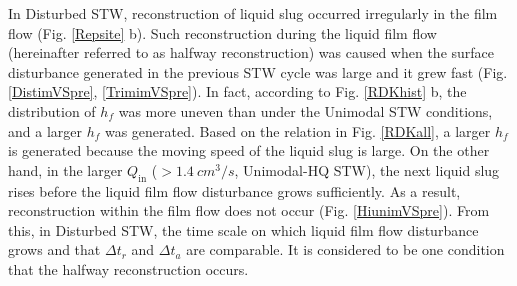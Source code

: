 \documentclass[aps,pre,preprint,groupedaddress,showkeys]{revtex4-2}
\begin{document}
In Disturbed STW, reconstruction of liquid slug occurred irregularly in the film flow (Fig. \ref{Repsite} b).
Such reconstruction during the liquid film flow (hereinafter referred to as halfway reconstruction) was caused when the surface disturbance generated in the previous STW cycle was large and it grew fast (Fig. \ref{DistimVSpre}, \ref{TrimimVSpre}).
In fact, according to Fig. \ref{RDKhist} b, the distribution of $ h_f $ was more uneven than under the Unimodal STW conditions, and a larger $ h_f $ was generated.
Based on the relation in Fig. \ref{RDKall}, a larger $ h_f $ is generated because the moving speed of the liquid slug is large.
On the other hand, in the larger $ Q_ \mathrm {in} $ ($> \SI{1.4}{cm ^ 3/ s}$, Unimodal-HQ STW), the next liquid slug rises before the liquid film flow disturbance grows sufficiently.
As a result, reconstruction within the film flow does not occur (Fig. \ref{HiunimVSpre}).
From this, in Disturbed STW, the time scale on which liquid film flow disturbance grows and that $ \Delta t_r $ and $ \Delta t_a $ are comparable. 
It is considered to be one condition that the halfway reconstruction occurs.
\end{document}
